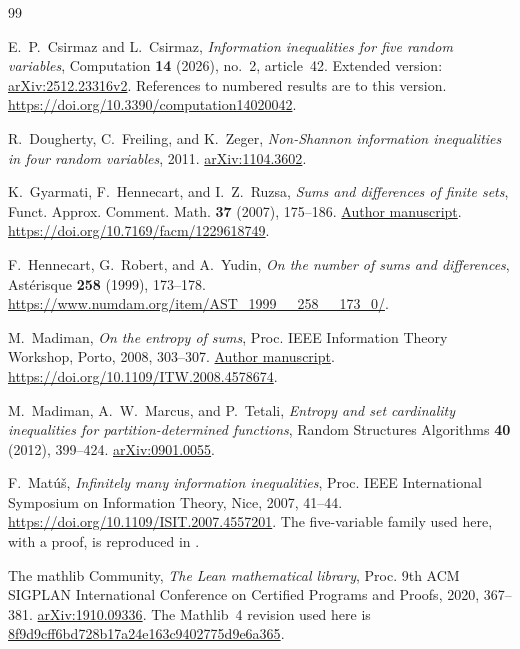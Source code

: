 \documentclass[11pt]{amsart}
\theoremstyle{definition}
\theoremstyle{remark}
\numberwithin{equation}{section}
\begin{document}
\begin{thebibliography}{99}

 E.~P.~Csirmaz and L.~Csirmaz,
\emph{Information inequalities for five random variables},
Computation \textbf{14} (2026), no.~2, article~42.
Extended version: \href{https://arxiv.org/abs/2512.23316v2}{arXiv:2512.23316v2}.
References to numbered results are to this version.
\url{https://doi.org/10.3390/computation14020042}.

 R.~Dougherty, C.~Freiling, and K.~Zeger,
\emph{Non-Shannon information inequalities in four random variables},
2011. \href{https://arxiv.org/abs/1104.3602}{arXiv:1104.3602}.

 K.~Gyarmati, F.~Hennecart, and I.~Z.~Ruzsa,
\emph{Sums and differences of finite sets},
Funct. Approx. Comment. Math. \textbf{37} (2007), 175--186.
\href{https://gyarmatikati.web.elte.hu/publ/sumdiffv.pdf}{Author manuscript}.
\url{https://doi.org/10.7169/facm/1229618749}.

 F.~Hennecart, G.~Robert, and A.~Yudin,
\emph{On the number of sums and differences},
Ast\'erisque \textbf{258} (1999), 173--178.
\url{https://www.numdam.org/item/AST_1999__258__173_0/}.

 M.~Madiman, \emph{On the entropy of sums},
Proc. IEEE Information Theory Workshop, Porto, 2008, 303--307.
\href{https://www.stat.yale.edu/~mm888/Pubs/2008/ITW-sums08.pdf}{Author manuscript}.
\url{https://doi.org/10.1109/ITW.2008.4578674}.

 M.~Madiman, A.~W.~Marcus, and P.~Tetali,
\emph{Entropy and set cardinality inequalities for partition-determined functions},
Random Structures Algorithms \textbf{40} (2012), 399--424.
\href{https://arxiv.org/abs/0901.0055}{arXiv:0901.0055}.

 F.~Mat\'u\v{s}, \emph{Infinitely many information inequalities},
Proc. IEEE International Symposium on Information Theory, Nice, 2007, 41--44.
\url{https://doi.org/10.1109/ISIT.2007.4557201}.
The five-variable family used here, with a proof, is reproduced in
\cite[Theorem~22]{CC}.

 The mathlib Community, \emph{The Lean mathematical library},
Proc. 9th ACM SIGPLAN International Conference on Certified Programs and Proofs,
2020, 367--381.
\href{https://arxiv.org/abs/1910.09336}{arXiv:1910.09336}.
The Mathlib~4 revision used here is
\href{https://github.com/leanprover-community/mathlib4/tree/8f9d9cff6bd728b17a24e163c9402775d9e6a365}{8f9d9cff6bd728b17a24e163c9402775d9e6a365}.


\end{thebibliography}
\end{document}
